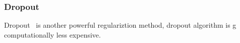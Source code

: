 \subsubsection{Dropout}

Dropout~\cite{JMLR:v15:srivastava14a} is another powerful regulariztion method, dropout algorithm is g computationally less expensive. 